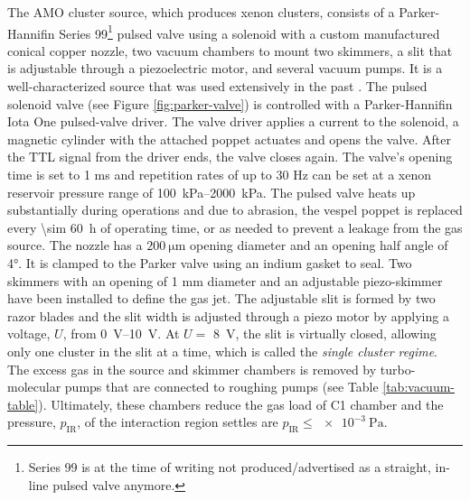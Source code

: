 The AMO cluster source, which produces xenon clusters, consists of a Parker-Hannifin Series 99\footnote{Series 99 is at the time of writing not produced/advertised as a straight, in-line pulsed valve anymore.} pulsed valve using a solenoid with a custom manufactured conical copper nozzle, two vacuum chambers to mount two skimmers, a slit that is adjustable through a piezoelectric motor, and several vacuum pumps. It is a well-characterized source that was used extensively in the past \citep{Ferguson-2016-SciAdv,Ferguson-2015-JSR,Gorkhover-2012-PRL,Gorkhover-2016-NatPho,Rupp-2014-JCP}. The pulsed solenoid valve (see Figure \ref{fig:parker-valve}) is controlled with a Parker-Hannifin Iota One pulsed-valve driver. The valve driver applies a current to the solenoid, a magnetic cylinder with the attached poppet actuates and opens the valve. After the TTL signal from the driver ends, the valve closes again. The valve's opening time is set to 1 ms and repetition rates of up to $30$ Hz can be set at a xenon reservoir pressure range of \SIrange{100}{2000}{\kilo\pascal}. The pulsed valve heats up substantially during operations and due to abrasion, the vespel poppet is replaced every \SI{\sim 60}{\hour} of operating time, or as needed to prevent a leakage from the gas source. The nozzle has a $\SI{200}{\micro\meter}$ opening diameter and an opening half angle of \ang{4}. It is clamped to the Parker valve using an indium gasket to seal. Two skimmers with an opening of 1 mm diameter and an adjustable piezo-skimmer have been installed to define the gas jet. The adjustable slit is formed by two razor blades and the slit width is adjusted through a piezo motor by applying a voltage, $U$, from \SIrange{0}{10}{\volt}. At $U=$ \SI{8}{\volt}, the slit is virtually closed, allowing only one cluster in the slit at a time, which is called the \textit{single cluster regime}. The excess gas in the source and skimmer chambers is removed by turbo-molecular pumps that are connected to roughing pumps (see Table \ref{tab:vacuum-table}). Ultimately, these chambers reduce the gas load of C1 chamber and the pressure, $p_{\text{IR}}$, of the interaction region settles are $p_{\text{IR}}\leq \SI{e-3}{\pascal}$.\\[1\baselineskip]
